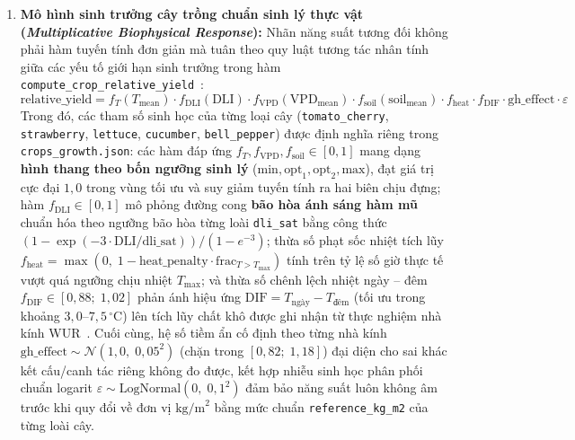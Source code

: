 \begin{enumerate}[leftmargin=*]
    \item \textbf{Mô hình sinh trưởng cây trồng chuẩn sinh lý thực vật (\textit{Multiplicative Biophysical Response}):} Nhãn năng suất tương đối không phải hàm tuyến tính đơn giản mà tuân theo quy luật tương tác nhân tính giữa các yếu tố giới hạn sinh trưởng trong hàm \texttt{compute\_crop\_relative\_yield}~\cite{monteithVpd,wurChallengeDataset}:
    \begin{equation}
    \text{relative\_yield} = f_T(T_{\text{mean}}) \cdot f_{\text{DLI}}(\text{DLI}) \cdot f_{\text{VPD}}(\text{VPD}_{\text{mean}}) \cdot f_{\text{soil}}(\text{soil}_{\text{mean}}) \cdot f_{\text{heat}} \cdot f_{\text{DIF}} \cdot \text{gh\_effect} \cdot \varepsilon
    \label{eq:synthetic-growth}
    \end{equation}
    Trong đó, các tham số sinh học của từng loại cây (\texttt{tomato\_cherry}, \texttt{strawberry}, \texttt{lettuce}, \texttt{cucumber}, \texttt{bell\_pepper}) được định nghĩa riêng trong \texttt{crops\_growth.json}: các hàm đáp ứng \(f_T, f_{\text{VPD}}, f_{\text{soil}} \in [0, 1]\) mang dạng \textbf{hình thang theo bốn ngưỡng sinh lý} (\(\text{min}, \text{opt}_1, \text{opt}_2, \text{max}\)), đạt giá trị cực đại \(1{,}0\) trong vùng tối ưu và suy giảm tuyến tính ra hai biên chịu đựng; hàm \(f_{\text{DLI}} \in [0, 1]\) mô phỏng đường cong \textbf{bão hòa ánh sáng hàm mũ} chuẩn hóa theo ngưỡng bão hòa từng loài \texttt{dli\_sat} bằng công thức \((1 - \exp(-3 \cdot \text{DLI}/\text{dli\_sat})) / (1 - e^{-3})\); thừa số phạt sốc nhiệt tích lũy \(f_{\text{heat}} = \max(0,\; 1 - \text{heat\_penalty} \cdot \text{frac}_{T > T_{\max}})\) tính trên tỷ lệ số giờ thực tế vượt quá ngưỡng chịu nhiệt \(T_{\max}\); và thừa số chênh lệch nhiệt ngày -- đêm \(f_{\text{DIF}} \in [0{,}88;\; 1{,}02]\) phản ánh hiệu ứng \(\text{DIF} = T_{\text{ngày}} - T_{\text{đêm}}\) (tối ưu trong khoảng \(3{,}0\text{--}7{,}5\,^\circ\text{C}\)) lên tích lũy chất khô được ghi nhận từ thực nghiệm nhà kính WUR~\cite{wurChallengeDataset}. Cuối cùng, hệ số tiềm ẩn cố định theo từng nhà kính \(\text{gh\_effect} \sim \mathcal{N}(1{,}0,\; 0{,}05^2)\) (chặn trong \([0{,}82;\; 1{,}18]\)) đại diện cho sai khác kết cấu/canh tác riêng không đo được, kết hợp nhiễu sinh học phân phối chuẩn logarit \(\varepsilon \sim \text{LogNormal}(0,\; 0{,}1^2)\) đảm bảo năng suất luôn không âm trước khi quy đổi về đơn vị \(\text{kg/m}^2\) bằng mức chuẩn \texttt{reference\_kg\_m2} của từng loài cây.


\end{enumerate}
